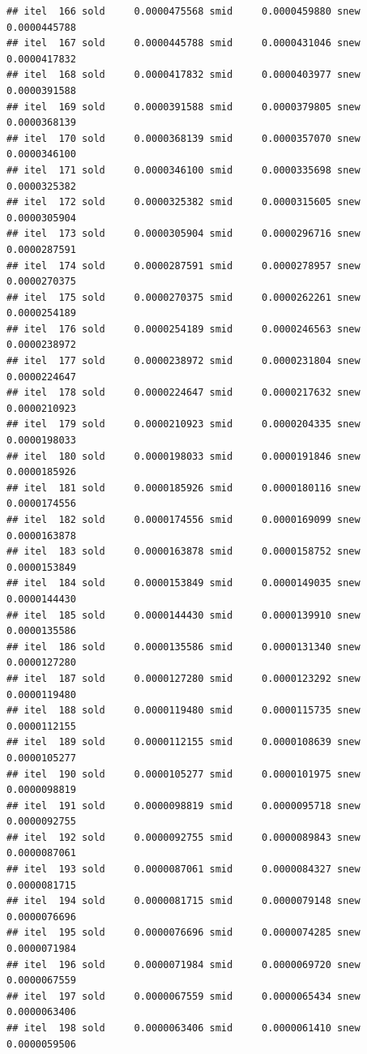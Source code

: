 \documentclass[
  12pt,
]{article}
\begin{document}
\begin{verbatim}
## itel  166 sold     0.0000475568 smid     0.0000459880 snew     0.0000445788 
## itel  167 sold     0.0000445788 smid     0.0000431046 snew     0.0000417832 
## itel  168 sold     0.0000417832 smid     0.0000403977 snew     0.0000391588 
## itel  169 sold     0.0000391588 smid     0.0000379805 snew     0.0000368139 
## itel  170 sold     0.0000368139 smid     0.0000357070 snew     0.0000346100 
## itel  171 sold     0.0000346100 smid     0.0000335698 snew     0.0000325382 
## itel  172 sold     0.0000325382 smid     0.0000315605 snew     0.0000305904 
## itel  173 sold     0.0000305904 smid     0.0000296716 snew     0.0000287591 
## itel  174 sold     0.0000287591 smid     0.0000278957 snew     0.0000270375 
## itel  175 sold     0.0000270375 smid     0.0000262261 snew     0.0000254189 
## itel  176 sold     0.0000254189 smid     0.0000246563 snew     0.0000238972 
## itel  177 sold     0.0000238972 smid     0.0000231804 snew     0.0000224647 
## itel  178 sold     0.0000224647 smid     0.0000217632 snew     0.0000210923 
## itel  179 sold     0.0000210923 smid     0.0000204335 snew     0.0000198033 
## itel  180 sold     0.0000198033 smid     0.0000191846 snew     0.0000185926 
## itel  181 sold     0.0000185926 smid     0.0000180116 snew     0.0000174556 
## itel  182 sold     0.0000174556 smid     0.0000169099 snew     0.0000163878 
## itel  183 sold     0.0000163878 smid     0.0000158752 snew     0.0000153849 
## itel  184 sold     0.0000153849 smid     0.0000149035 snew     0.0000144430 
## itel  185 sold     0.0000144430 smid     0.0000139910 snew     0.0000135586 
## itel  186 sold     0.0000135586 smid     0.0000131340 snew     0.0000127280 
## itel  187 sold     0.0000127280 smid     0.0000123292 snew     0.0000119480 
## itel  188 sold     0.0000119480 smid     0.0000115735 snew     0.0000112155 
## itel  189 sold     0.0000112155 smid     0.0000108639 snew     0.0000105277 
## itel  190 sold     0.0000105277 smid     0.0000101975 snew     0.0000098819 
## itel  191 sold     0.0000098819 smid     0.0000095718 snew     0.0000092755 
## itel  192 sold     0.0000092755 smid     0.0000089843 snew     0.0000087061 
## itel  193 sold     0.0000087061 smid     0.0000084327 snew     0.0000081715 
## itel  194 sold     0.0000081715 smid     0.0000079148 snew     0.0000076696 
## itel  195 sold     0.0000076696 smid     0.0000074285 snew     0.0000071984 
## itel  196 sold     0.0000071984 smid     0.0000069720 snew     0.0000067559 
## itel  197 sold     0.0000067559 smid     0.0000065434 snew     0.0000063406 
## itel  198 sold     0.0000063406 smid     0.0000061410 snew     0.0000059506 

\end{verbatim}
\end{document}

